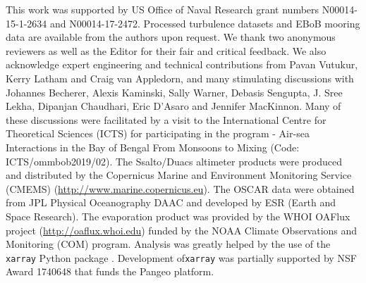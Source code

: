 \documentclass[onecol]{ametsoc}
\begin{document}
This work was supported by US Office of Naval Research grant numbers N00014-15-1-2634 and N00014-17-2472.
Processed turbulence datasets and EBoB mooring data are available from the authors upon request.
We thank two anonymous reviewers as well as the Editor for their fair and critical feedback.
We also acknowledge expert engineering and technical contributions from Pavan Vutukur, Kerry Latham and Craig van Appledorn, and many stimulating discussions with Johannes Becherer, Alexis Kaminski, Sally Warner, Debasis Sengupta, J. Sree Lekha, Dipanjan Chaudhari, Eric D'Asaro and Jennifer MacKinnon.
Many of these discussions were facilitated by a visit to the International Centre for Theoretical Sciences (ICTS) for participating in the program - Air-sea Interactions in the Bay of Bengal From Monsoons to Mixing (Code: ICTS/ommbob2019/02).
The Ssalto/Duacs altimeter products were produced and distributed by the Copernicus Marine and Environment Monitoring Service (CMEMS) (\url{http://www.marine.copernicus.eu}).
The OSCAR data were obtained from JPL Physical Oceanography DAAC and developed by ESR (Earth and Space Research).
The evaporation product was provided by the WHOI OAFlux project (\url{http://oaflux.whoi.edu}) funded by the NOAA Climate Observations and Monitoring (COM) program.
Analysis was greatly helped by the use of the \texttt{xarray} Python package \citep{Hoyer2017}.
Development of\texttt{xarray} was partially supported by NSF Award 1740648 that funds the Pangeo platform.
\end{document}

